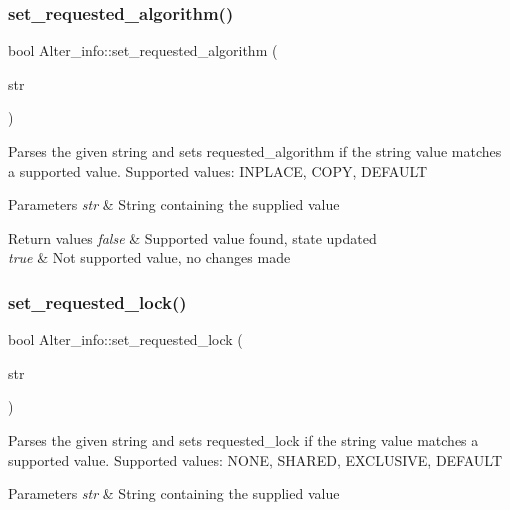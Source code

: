 \subsubsection{\texorpdfstring{set\+\_\+requested\+\_\+algorithm()}{set\_requested\_algorithm()}}
{\footnotesize\ttfamily bool Alter\+\_\+info\+::set\+\_\+requested\+\_\+algorithm (\begin{DoxyParamCaption}\item[{const L\+E\+X\+\_\+\+S\+T\+R\+I\+NG $\ast$}]{str }\end{DoxyParamCaption})}

Parses the given string and sets requested\+\_\+algorithm if the string value matches a supported value. Supported values\+: I\+N\+P\+L\+A\+CE, C\+O\+PY, D\+E\+F\+A\+U\+LT


\begin{DoxyParams}{Parameters}
{\em str} & String containing the supplied value \\
\hline
\end{DoxyParams}

\begin{DoxyRetVals}{Return values}
{\em false} & Supported value found, state updated \\
\hline
{\em true} & Not supported value, no changes made \\
\hline
\end{DoxyRetVals}
\mbox{\label{classAlter__info_a1099c6e4fdc5090644593b0b1b8ba632}} 
\subsubsection{\texorpdfstring{set\+\_\+requested\+\_\+lock()}{set\_requested\_lock()}}
{\footnotesize\ttfamily bool Alter\+\_\+info\+::set\+\_\+requested\+\_\+lock (\begin{DoxyParamCaption}\item[{const L\+E\+X\+\_\+\+S\+T\+R\+I\+NG $\ast$}]{str }\end{DoxyParamCaption})}

Parses the given string and sets requested\+\_\+lock if the string value matches a supported value. Supported values\+: N\+O\+NE, S\+H\+A\+R\+ED, E\+X\+C\+L\+U\+S\+I\+VE, D\+E\+F\+A\+U\+LT


\begin{DoxyParams}{Parameters}
{\em str} & String containing the supplied value \\
\hline
\end{DoxyParams}

